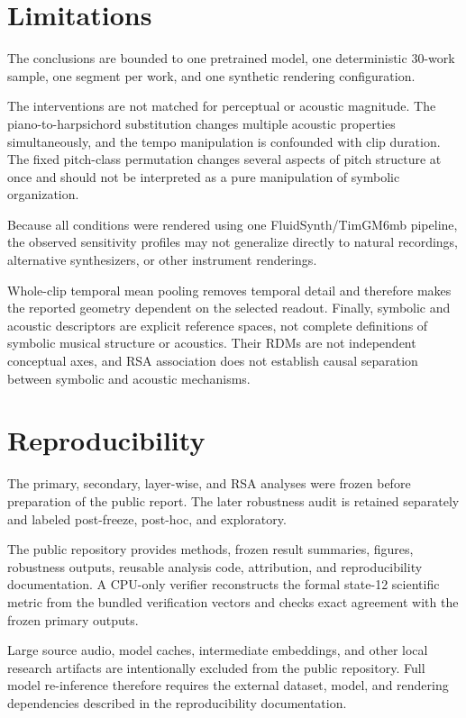 \documentclass[conference]{IEEEtran}
\begin{document}
\section{Limitations}

The conclusions are bounded to one pretrained model, one deterministic
30-work sample, one segment per work, and one synthetic rendering
configuration.

The interventions are not matched for perceptual or acoustic magnitude.
The piano-to-harpsichord substitution changes multiple acoustic properties
simultaneously, and the tempo manipulation is confounded with clip duration.
The fixed pitch-class permutation changes several aspects of pitch structure
at once and should not be interpreted as a pure manipulation of symbolic
organization.

Because all conditions were rendered using one FluidSynth/TimGM6mb pipeline,
the observed sensitivity profiles may not generalize directly to natural
recordings, alternative synthesizers, or other instrument renderings.

Whole-clip temporal mean pooling removes temporal detail and therefore makes
the reported geometry dependent on the selected readout.
Finally, symbolic and acoustic descriptors are explicit reference spaces, not
complete definitions of symbolic musical structure or acoustics.
Their RDMs are not independent conceptual axes, and RSA association does not
establish causal separation between symbolic and acoustic mechanisms.

\section{Reproducibility}

The primary, secondary, layer-wise, and RSA analyses were frozen before
preparation of the public report.
The later robustness audit is retained separately and labeled
post-freeze, post-hoc, and exploratory.

The public repository provides methods, frozen result summaries, figures,
robustness outputs, reusable analysis code, attribution, and reproducibility
documentation.
A CPU-only verifier reconstructs the formal state-12 scientific metric from
the bundled verification vectors and checks exact agreement with the frozen
primary outputs.

Large source audio, model caches, intermediate embeddings, and other local
research artifacts are intentionally excluded from the public repository.
Full model re-inference therefore requires the external dataset, model, and
rendering dependencies described in the reproducibility documentation.
\end{document}
